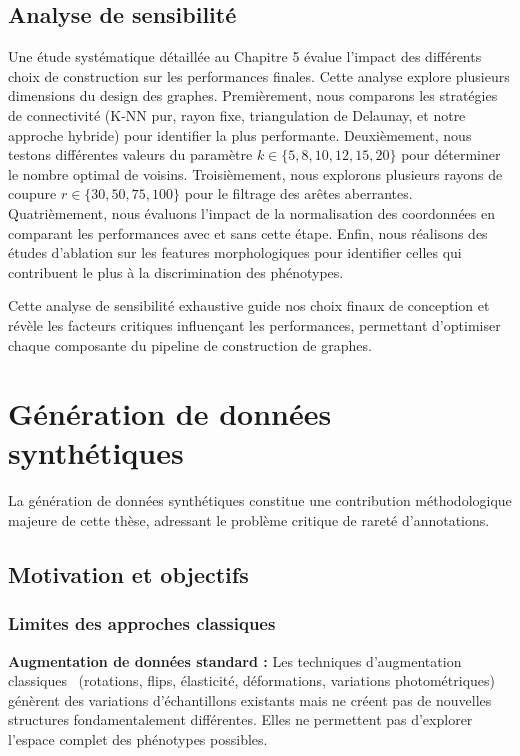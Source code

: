 \subsection{Analyse de sensibilité}

Une étude systématique détaillée au Chapitre 5 évalue l'impact des différents choix de construction sur les performances finales. Cette analyse explore plusieurs dimensions du design des graphes. Premièrement, nous comparons les stratégies de connectivité (K-NN pur, rayon fixe, triangulation de Delaunay, et notre approche hybride) pour identifier la plus performante. Deuxièmement, nous testons différentes valeurs du paramètre $k \in \{5, 8, 10, 12, 15, 20\}$ pour déterminer le nombre optimal de voisins. Troisièmement, nous explorons plusieurs rayons de coupure $r \in \{30, 50, 75, 100\}$ pour le filtrage des arêtes aberrantes. Quatrièmement, nous évaluons l'impact de la normalisation des coordonnées en comparant les performances avec et sans cette étape. Enfin, nous réalisons des études d'ablation sur les features morphologiques pour identifier celles qui contribuent le plus à la discrimination des phénotypes.

Cette analyse de sensibilité exhaustive guide nos choix finaux de conception et révèle les facteurs critiques influençant les performances, permettant d'optimiser chaque composante du pipeline de construction de graphes.

\section{Génération de données synthétiques}

La génération de données synthétiques constitue une contribution méthodologique majeure de cette thèse, adressant le problème critique de rareté d'annotations.

\subsection{Motivation et objectifs}

\subsubsection{Limites des approches classiques}

\textbf{Augmentation de données standard :}
Les techniques d'augmentation classiques~\cite{Shorten2019} (rotations, flips, élasticité, déformations, variations photométriques) génèrent des variations d'échantillons existants mais ne créent pas de nouvelles structures fondamentalement différentes. Elles ne permettent pas d'explorer l'espace complet des phénotypes possibles.

